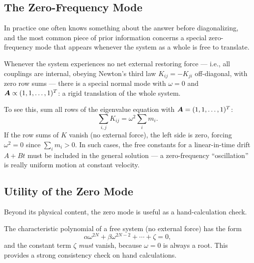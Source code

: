 \subsection{The Zero-Frequency Mode}

In practice one often knows something about the answer before diagonalizing, and the most common piece of prior information concerns a special zero-frequency mode that appears whenever the system as a whole is free to translate.

\begin{fact}
Whenever the system experiences no net external restoring force --- i.e., all couplings are internal, obeying Newton's third law $K_{ij} = -K_{ji}$ off-diagonal, with zero row sums --- there is a special normal mode with $\omega = 0$ and $\vect{A} \propto (1, 1, \ldots, 1)^T$: a rigid translation of the whole system.
\end{fact}

To see this, sum all rows of the eigenvalue equation with $\vect{A} = (1, 1, \ldots, 1)^T$:
\begin{equation}
    \sum_{i,j} K_{ij} = \omega^2 \sum_i m_i.
\end{equation}
If the row sums of $K$ vanish (no external force), the left side is zero, forcing $\omega^2 = 0$ since $\sum_i m_i > 0$. In such cases, the free constants for a linear-in-time drift $A + Bt$ must be included in the general solution --- a zero-frequency ``oscillation'' is really uniform motion at constant velocity.

\subsection{Utility of the Zero Mode}

Beyond its physical content, the zero mode is useful as a hand-calculation check.

\begin{fact}
The characteristic polynomial of a free system (no external force) has the form
\begin{equation}
    \alpha \omega^{2N} + \beta \omega^{2N-2} + \cdots + \zeta = 0,
\end{equation}
and the constant term $\zeta$ \emph{must} vanish, because $\omega = 0$ is always a root. This provides a strong consistency check on hand calculations.
\end{fact}

